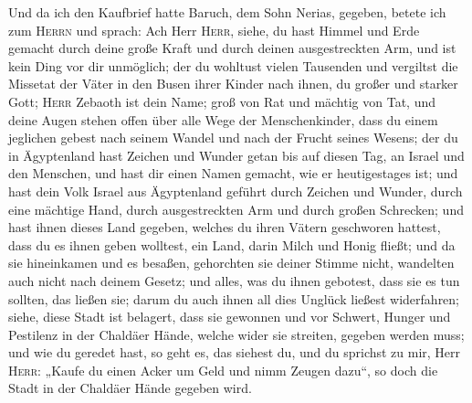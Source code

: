  Und da ich den Kaufbrief hatte Baruch, dem Sohn Nerias,
gegeben, betete ich zum \textsc{Herrn} und sprach:  Ach
Herr \textsc{Herr}, siehe, du hast Himmel und Erde gemacht durch deine
große Kraft und durch deinen ausgestreckten Arm, und ist kein Ding vor
dir unmöglich;  der du wohltust vielen Tausenden und
vergiltst die Missetat der Väter in den Busen ihrer Kinder nach ihnen,
du großer und starker Gott; \textsc{Herr} Zebaoth ist dein Name;
 groß von Rat und mächtig von Tat, und deine Augen stehen
offen über alle Wege der Menschenkinder, dass du einem jeglichen gebest
nach seinem Wandel und nach der Frucht seines Wesens; 
der du in Ägyptenland hast Zeichen und Wunder getan bis auf diesen Tag,
an Israel und den Menschen, und hast dir einen Namen gemacht, wie er
heutigestages ist;  und hast dein Volk Israel aus
Ägyptenland geführt durch Zeichen und Wunder, durch eine mächtige Hand,
durch ausgestreckten Arm und durch großen Schrecken;  und
hast ihnen dieses Land gegeben, welches du ihren Vätern geschworen
hattest, dass du es ihnen geben wolltest, ein Land, darin Milch und
Honig fließt;  und da sie hineinkamen und es besaßen,
gehorchten sie deiner Stimme nicht, wandelten auch nicht nach deinem
Gesetz; und alles, was du ihnen gebotest, dass sie es tun sollten, das
ließen sie; darum du auch ihnen all dies Unglück ließest widerfahren;
 siehe, diese Stadt ist belagert, dass sie gewonnen und
vor Schwert, Hunger und Pestilenz in der Chaldäer Hände, welche wider
sie streiten, gegeben werden muss; und wie du geredet hast, so geht es,
das siehest du,  und du sprichst zu mir, Herr
\textsc{Herr}: „Kaufe du einen Acker um Geld und nimm Zeugen dazu``, so
doch die Stadt in der Chaldäer Hände gegeben wird.

